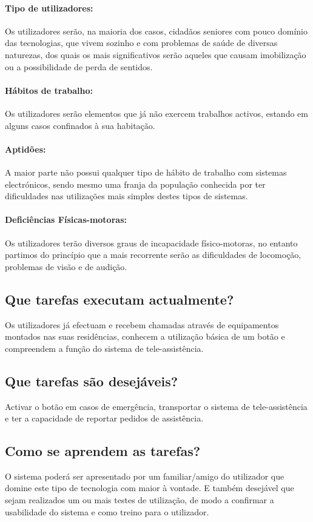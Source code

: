 \paragraph{Tipo de utilizadores:} Os utilizadores serão, na maioria dos casos, cidadãos seniores com pouco domínio das tecnologias, que vivem sozinho e com problemas de saúde de diversas naturezas, dos quais os mais significativos serão aqueles que causam imobilização ou a possibilidade de perda de sentidos.

\paragraph{Hábitos de trabalho:} Os utilizadores serão elementos que já não exercem trabalhos activos, estando em alguns casos confinados à sua habitação.

\paragraph{Aptidões:} A maior parte não possui qualquer tipo de hábito de trabalho com sistemas electrónicos, sendo mesmo uma franja da população conhecida por ter dificuldades nas utilizações mais simples destes tipos de sistemas.

\paragraph{Deficiências Físicas-motoras:} Os utilizadores terão diversos graus de incapacidade físico-motoras, no entanto partimos do princípio que a mais recorrente serão as dificuldades de locomoção, problemas de visão e de audição.

\subsection{Que tarefas executam actualmente?}
Os utilizadores já efectuam e recebem chamadas através de equipamentos montados nas suas residências, conhecem a utilização básica de um botão e compreendem a função do sistema de tele-assistência.

\subsection{Que tarefas são desejáveis?}
Activar o botão em casos de emergência, transportar o sistema de tele-assistência e ter a capacidade de reportar pedidos de assistência.

\subsection{Como se aprendem as tarefas?}
O sistema poderá ser apresentado por um familiar/amigo do utilizador que domine este tipo de tecnologia com maior à vontade. E também desejável que sejam realizados um ou mais testes de utilização, de modo a confirmar a usabilidade do sistema e como treino para o utilizador.

